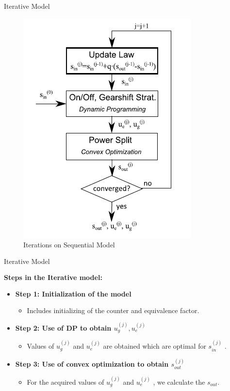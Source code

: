 \documentclass{beamer}
\begin{document}
\begin{frame}{Iterative Model}
    \begin{figure}
    \centering
    \includegraphics[scale=0.7]{Iterative.png}
    \caption{Iterations on Sequential Model}
    \label{fig:Iter}
    \end{figure}
\end{frame}

\begin{frame}{Iterative Model}

    \textbf{Steps in the Iterative model:}\\
    \begin{itemize}
        
    \item\textbf{Step 1: Initialization of the model}\\
    \begin{itemize}
        \item Includes initializing of the counter and equivalence factor.\\
    \end{itemize}
    \item\textbf{Step 2: Use of DP to obtain $u^{(j)}_g , u^{(j)}_e$}\\
    
    \begin{itemize}
        \item Values of $u^{(j)}_g$ and $u^{(j)}_e$ are obtained which are optimal for $s^{(j)}_{in}$ .
    \end{itemize}
    
    \item\textbf{Step 3: Use of convex optimization to obtain $s^{(j)}_{out}$}\\
        \begin{itemize}
            \item For the acquired values of $u^{(j)}_g$ and $u^{(j)}_e$ , we calculate the $s_{out}$.
        \end{itemize}
    
    \end{itemize}
    
\end{frame}
\end{document}
